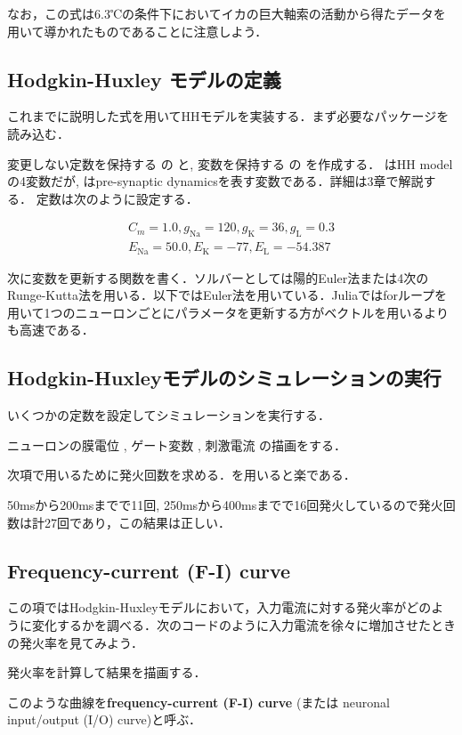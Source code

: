 なお，この式は6.3℃の条件下においてイカの巨大軸索の活動から得たデータを用いて導かれたものであることに注意しよう．
\subsection{Hodgkin-Huxley モデルの定義}
これまでに説明した式を用いてHHモデルを実装する．まず必要なパッケージを読み込む．

変更しない定数を保持する  の  と, 変数を保持する  の  を作成する． はHH modelの4変数だが,  はpre-synaptic dynamicsを表す変数である．詳細は3章で解説する． 定数は次のように設定する． 


\begin{align}
C_m=1.0, g_{\text{Na}}=120, g_{\text{K}}=36, g_{\text{L}}=0.3\\
E_{\text{Na}}=50.0, E_{\text{K}}=-77, E_{\text{L}}=-54.387 
\end{align}


次に変数を更新する関数を書く．ソルバーとしては陽的Euler法または4次のRunge-Kutta法を用いる．以下ではEuler法を用いている．Juliaではforループを用いて1つのニューロンごとにパラメータを更新する方がベクトルを用いるよりも高速である．

\subsection{Hodgkin-Huxleyモデルのシミュレーションの実行}
いくつかの定数を設定してシミュレーションを実行する．

ニューロンの膜電位 , ゲート変数 , 刺激電流 の描画をする．


次項で用いるために発火回数を求める．を用いると楽である．

50msから200msまでで11回, 250msから400msまでで16回発火しているので発火回数は計27回であり，この結果は正しい．
\subsection{Frequency-current (F-I) curve}
この項ではHodgkin-Huxleyモデルにおいて，入力電流に対する発火率がどのように変化するかを調べる．次のコードのように入力電流を徐々に増加させたときの発火率を見てみよう．

発火率を計算して結果を描画する．



このような曲線を\textbf{frequency-current (F-I) curve} (または neuronal input/output (I/O) curve)と呼ぶ．
